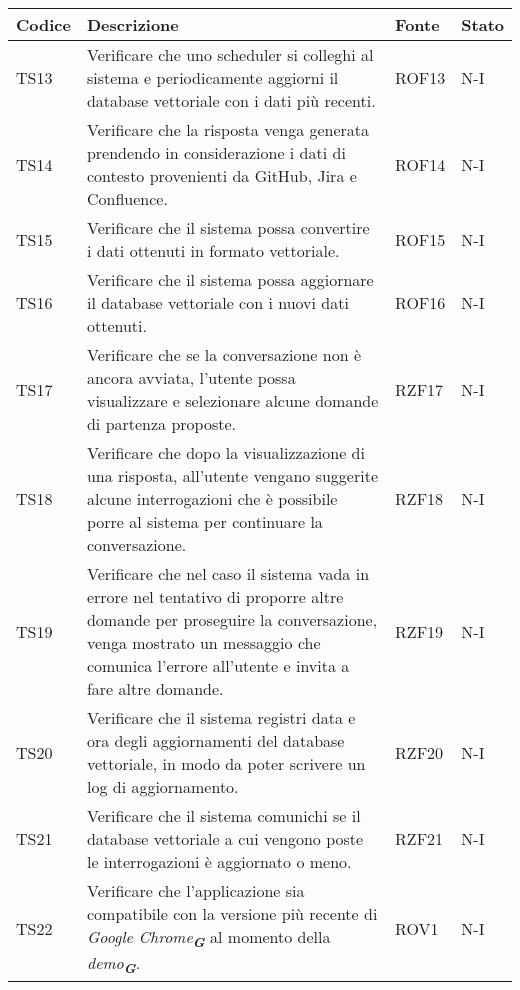 \newpage


\begin{table}[h!]
    \centering
    \renewcommand{\arraystretch}{1.5}
    \begin{tabularx}{\textwidth}{|p{}|X|p{}|p{}|}\hline
    \rowcolor[HTML]{FFD700}
    \textbf{Codice} & \textbf{Descrizione} & \textbf{Fonte} & \textbf{Stato} \\ \hline
    TS13 & Verificare che uno scheduler si colleghi al sistema e periodicamente aggiorni il database vettoriale con i dati più recenti. & ROF13 & N-I \\ \hline
    TS14 & Verificare che la risposta venga generata prendendo in considerazione i dati di contesto provenienti da GitHub, Jira e Confluence. & ROF14 & N-I \\ \hline
    TS15 & Verificare che il sistema possa convertire i dati ottenuti in formato vettoriale. & ROF15 & N-I \\ \hline
    TS16 & Verificare che il sistema possa aggiornare il database vettoriale con i nuovi dati ottenuti. & ROF16 & N-I \\ \hline
    TS17 & Verificare che se la conversazione non è ancora avviata, l'utente possa visualizzare e selezionare alcune domande di partenza proposte. & RZF17 & N-I \\ \hline
    TS18 & Verificare che dopo la visualizzazione di una risposta, all'utente vengano suggerite alcune interrogazioni che è possibile porre al sistema per continuare la conversazione. & RZF18 & N-I \\ \hline
    TS19 & Verificare che nel caso il sistema vada in errore nel tentativo di proporre altre domande per proseguire la conversazione, venga mostrato un messaggio che comunica l'errore all'utente e invita a fare altre domande. & RZF19 & N-I \\ \hline
    TS20 & Verificare che il sistema registri data e ora degli aggiornamenti del database vettoriale, in modo da poter scrivere un log di aggiornamento. & RZF20 & N-I \\ \hline
    TS21 & Verificare che il sistema comunichi se il database vettoriale a cui vengono poste le interrogazioni è aggiornato o meno. & RZF21 & N-I \\ \hline
    TS22 & Verificare che l'applicazione sia compatibile con la versione più recente di \emph{Google Chrome}\textsubscript{\textit{\textbf{G}}} al momento della \emph{demo}\textsubscript{\textit{\textbf{G}}}. & ROV1 & N-I \\ \hline

\end{tabularx}
\end{table}
